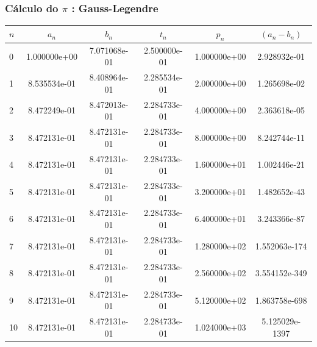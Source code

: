 \documentclass{beamer}
\newcommand\safepi[0]{
	\texorpdfstring{$\pi$}{Pi}
}
\begin{document}
\begin{frame}

\frametitle{Cálculo do \safepi: Gauss-Legendre}

\scriptsize
\renewcommand*{\arraystretch}{1.3}
\begin{table}[h]
	\centering
	\begin{tabular}{|l|c|c|c|c|c|}
		\hline
		$n$ & $a_n$	& $b_n$ & $t_n$ & $p_n$ & $(a_n - b_n)$\\ 
		\hline
		0& 1.000000e+00& 7.071068e-01& 2.500000e-01& 1.000000e+00& 2.928932e-01\\
		1& 8.535534e-01& 8.408964e-01& 2.285534e-01& 2.000000e+00& 1.265698e-02\\
		2& 8.472249e-01& 8.472013e-01& 2.284733e-01& 4.000000e+00& 2.363618e-05\\
		3& 8.472131e-01& 8.472131e-01& 2.284733e-01& 8.000000e+00& 8.242744e-11\\
		4& 8.472131e-01& 8.472131e-01& 2.284733e-01& 1.600000e+01& 1.002446e-21\\
		5& 8.472131e-01& 8.472131e-01& 2.284733e-01& 3.200000e+01& 1.482652e-43\\
		6& 8.472131e-01& 8.472131e-01& 2.284733e-01& 6.400000e+01& 3.243366e-87\\
		7& 8.472131e-01& 8.472131e-01& 2.284733e-01& 1.280000e+02& 1.552063e-174\\
		8& 8.472131e-01& 8.472131e-01& 2.284733e-01& 2.560000e+02& 3.554152e-349\\
		9& 8.472131e-01& 8.472131e-01& 2.284733e-01& 5.120000e+02& 1.863758e-698\\
	   10& 8.472131e-01& 8.472131e-01& 2.284733e-01& 1.024000e+03& 5.125029e-1397\\
	   \hline
	\end{tabular}
\end{table}
\renewcommand*{\arraystretch}{1}
\normalsize
	
\end{frame}

\end{document}
